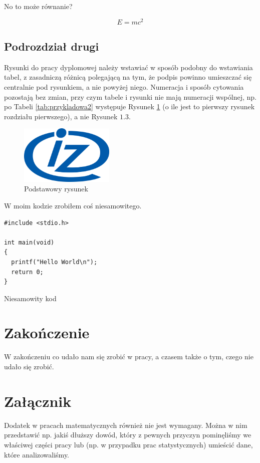 \documentclass[polish,engineering]{wizthesis}
\begin{document}
No to może równanie?

\begin{equation}
  E = mc^2
\end{equation}


\section{Podrozdział drugi}

Rysunki do pracy dyplomowej należy wstawiać w sposób podobny do wstawiania tabel, z zasadniczą różnicą polegającą na tym, że podpis powinno umieszczać się centralnie pod rysunkiem, a nie powyżej niego. Numeracja i sposób cytowania pozostają bez zmian, przy czym tabele i rysunki nie mają numeracji wspólnej, np. po Tabeli \ref{tab:przykladowa2} występuje Rysunek \ref{rys:przykladowy} (o ile jest to pierwszy rysunek rozdziału pierwszego), a nie Rysunek $1.3$.
\begin{figure}[ht]
  \centering                  
  \includegraphics[width=0.4\textwidth]{img/iz_logo.png}
  \caption{Podstawowy rysunek}
  \label{rys:przykladowy}
\end{figure}

W moim kodzie zrobiłem coś niesamowitego.
\begin{listing}[ht]
  \begin{verbatim}
#include <stdio.h>

int main(void)
{
  printf("Hello World\n");
  return 0;
}
  \end{verbatim}
  \caption{Niesamowity kod}
  \label{lst:listing}
\end{listing}

\Blindtext


{\backmatter\chapter{Zakończenie}} %

W zakończeniu co udało nam się zrobić w pracy, a czasem także o tym, czego nie udało się zrobić. \blindtext[2]





\listoffigures

\listoftables

\listoflistings

\appendixpage


\appendix

\chapter{Załącznik}

Dodatek w pracach matematycznych również nie jest wymagany. Można w nim przedstawić np. jakiś dłuższy dowód, który z pewnych przyczyn pominęliśmy we właściwej części pracy lub (np. w przypadku prac statystycznych) umieścić dane, które analizowaliśmy.
\end{document}
